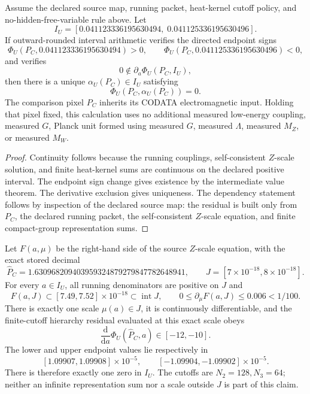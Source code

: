 \begin{theorem}\label{thm:particle-ru-witness}
Assume the declared source map, running packet, heat-kernel cutoff policy, and
no-hidden-free-variable rule above. Let
\[
I_U=[0.041123336195630494,\;0.041125336195630496].
\]
If outward-rounded interval arithmetic verifies the directed endpoint signs
\[
\Phi_U(P_C,0.041123336195630494)>0,
\qquad
\Phi_U(P_C,0.041125336195630496)<0,
\]
and verifies
\[
0\notin \partial_a\Phi_U(P_C,I_U),
\]
then there is a unique \(\alpha_U(P_C)\in I_U\) satisfying
\[
\Phi_U(P_C,\alpha_U(P_C))=0.
\]
The comparison pixel \(P_C\) inherits its CODATA electromagnetic input.
Holding that pixel fixed, this calculation uses no additional measured
low-energy coupling, measured \(G\), Planck unit formed using measured
\(G\), measured \(\Lambda\), measured \(M_Z\), or measured \(M_W\).
\end{theorem}

\begin{proof}
Continuity follows because the running couplings, self-consistent \(Z\)-scale solution, and
finite heat-kernel sums are continuous on the declared positive interval. The endpoint sign
change gives existence by the intermediate value theorem. The derivative exclusion gives
uniqueness. The dependency statement follows by inspection of the declared source map: the residual
is built only from \(P_C\), the declared running packet, the self-consistent \(Z\)-scale equation,
and finite compact-group representation sums.
\end{proof}

\begin{theorem}
\label{thm:particle-implicit-scale-attachment}
Let $F(a,\mu)$ be the right-hand side of the source $Z$-scale equation,
with the exact stored decimal
\[
 \widehat P_C=1.630968209403959324879279847782648941,
 \qquad J=[7\times10^{-18},8\times10^{-18}].
\]
For every $a\in I_U$, all running denominators are positive on $J$ and
\[
 F(a,J)\subset[7.49,7.52]\times10^{-18}\subset\operatorname{int}J,
 \qquad 0\le\partial_\mu F(a,J)\le0.006<1/100.
\]
There is exactly one scale $\mu(a)\in J$, it is continuously differentiable,
and the finite-cutoff hierarchy residual evaluated at this exact scale obeys
\[
 \frac{\mathrm d}{\mathrm da}\Phi_U(\widehat P_C,a)\in[-12,-10].
\]
The lower and upper endpoint values lie respectively in
\[
 [1.09907,1.09908]\times10^{-5},\qquad
 [-1.09904,-1.09902]\times10^{-5}.
\]
There is therefore exactly one zero in $I_U$. The cutoffs are $N_2=128,N_3=64$; neither an
infinite representation sum nor a scale outside $J$ is part of this claim.
\end{theorem}

